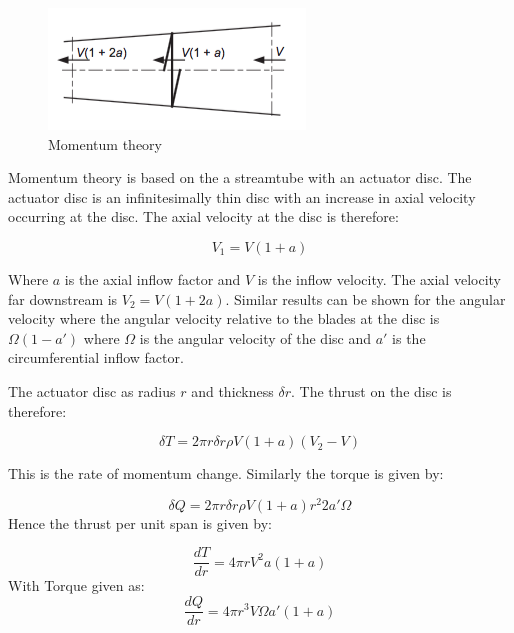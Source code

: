 \documentclass[]{report}
\begin{document}
\begin{figure}
	\centering
	\includegraphics[scale=0.5]{Momentum_theory}
	\caption{Momentum theory}
	\label{fig:momentum_theory}
\end{figure}

Momentum theory is based on the a streamtube with an actuator disc. The actuator disc is an infinitesimally thin disc with an increase in axial velocity occurring at the disc. The axial velocity at the disc is therefore:

\begin{equation}
V_1 = V(1+a)
\end{equation}

Where $a$ is the axial inflow factor and $V$ is the inflow velocity. The axial velocity far downstream is $V_2 = V(1+2a)$. Similar results can be shown for the angular velocity where the angular velocity relative to the blades at the disc is $\Omega (1-a')$ where $\Omega$ is the angular velocity of the disc and $a'$ is the circumferential inflow factor.

The actuator disc as radius $r$ and thickness $\delta r$. The thrust on the disc is therefore:

\begin{equation}
\delta T = 2\pi r \delta r \rho V(1 + a)(V_2 - V)
\label{eq:Thrust_momentum}
\end{equation}

This is the rate of momentum change. Similarly the torque is given by:

\begin{equation}
\delta Q = 2\pi r \delta r \rho V(1 + a)r^2 2 a' \Omega
\label{eq:Torque_momentum}
\end{equation}
Hence the thrust per unit span is given by:

\begin{equation}
\frac{dT}{dr} = 4 \pi r V^2 a (1 + a)
\label{eq:Thrust_unit_span_momentum}
\end{equation}
With Torque given as:
\begin{equation}
\frac{dQ}{dr} = 4 \pi r^3 V \Omega a' (1 + a)
\label{eq:Torque_unit_span_momentum}
\end{equation}
\end{document}
